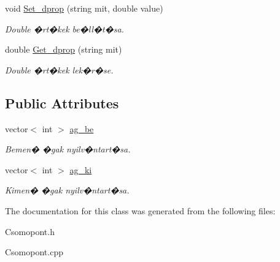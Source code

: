 \begin{DoxyCompactItemize}
\mbox{\label{class_csomopont_af64637d5f8124e9f3d121c7d941140fe}} 
void \hyperlink{class_csomopont_af64637d5f8124e9f3d121c7d941140fe}{Set\+\_\+dprop} (string mit, double value)
\begin{DoxyCompactList}\small\item\em Double �rt�kek be�ll�t�sa. \end{DoxyCompactList}\item 
\mbox{\label{class_csomopont_aab439a6b1e8b645a1efa4be53d065f11}} 
double \hyperlink{class_csomopont_aab439a6b1e8b645a1efa4be53d065f11}{Get\+\_\+dprop} (string mit)
\begin{DoxyCompactList}\small\item\em Double �rt�kek lek�r�se. \end{DoxyCompactList}\end{DoxyCompactItemize}
\subsection*{Public Attributes}
\begin{DoxyCompactItemize}
\item 
\mbox{\label{class_csomopont_a7244492608d916d60482d20dc58ea2ea}} 
vector$<$ int $>$ \hyperlink{class_csomopont_a7244492608d916d60482d20dc58ea2ea}{ag\+\_\+be}
\begin{DoxyCompactList}\small\item\em Bemen� �gak nyilv�ntart�sa. \end{DoxyCompactList}\item 
\mbox{\label{class_csomopont_a656bdaccf4486a668bfc158d10553ddc}} 
vector$<$ int $>$ \hyperlink{class_csomopont_a656bdaccf4486a668bfc158d10553ddc}{ag\+\_\+ki}
\begin{DoxyCompactList}\small\item\em Kimen� �gak nyilv�ntart�sa. \end{DoxyCompactList}\end{DoxyCompactItemize}


The documentation for this class was generated from the following files\+:\begin{DoxyCompactItemize}
\item 
Csomopont.\+h\item 
Csomopont.\+cpp\end{DoxyCompactItemize}
